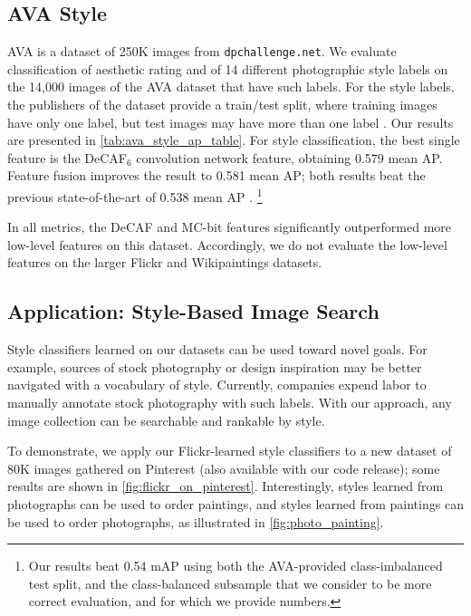 \subsection{AVA Style}
AVA \parencite{Murray-CVPR-2012} is a dataset of 250K images from \texttt{dpchallenge.net}.
We evaluate classification of aesthetic rating and of 14 different photographic style labels on the 14,000 images of the AVA dataset that have such labels.
For the style labels, the publishers of the dataset provide a train/test split, where training images have only one label, but test images may have more than one label \parencite{Murray-CVPR-2012}.
Our results are presented in \autoref{tab:ava_style_ap_table}.
For style classification, the best single feature is the DeCAF$_6$ convolution network feature, obtaining 0.579 mean AP.
Feature fusion improves the result to 0.581 mean AP; both results beat the previous state-of-the-art of 0.538 mean AP \parencite{Murray-CVPR-2012}.
\footnote{Our results beat 0.54 mAP using both the AVA-provided class-imbalanced test split, and the class-balanced subsample that we consider to be more correct evaluation, and for which we provide numbers.}

In all metrics, the DeCAF and MC-bit features significantly outperformed more low-level features on this dataset.
Accordingly, we do not evaluate the low-level features on the larger Flickr and Wikipaintings datasets.

\subsection{Application: Style-Based Image Search}
Style classifiers learned on our datasets can be used toward novel goals.
For example, sources of stock photography or design inspiration may be better navigated with a vocabulary of style.
Currently, companies expend labor to manually annotate stock photography with such labels.
With our approach, any image collection can be searchable and rankable by style.

To demonstrate, we apply our Flickr-learned style classifiers to a new dataset of 80K images gathered on Pinterest (also available with our code release); some results are shown in \autoref{fig:flickr_on_pinterest}.
Interestingly, styles learned from photographs can be used to order paintings, and styles learned from paintings can be used to order photographs, as illustrated in \autoref{fig:photo_painting}.

